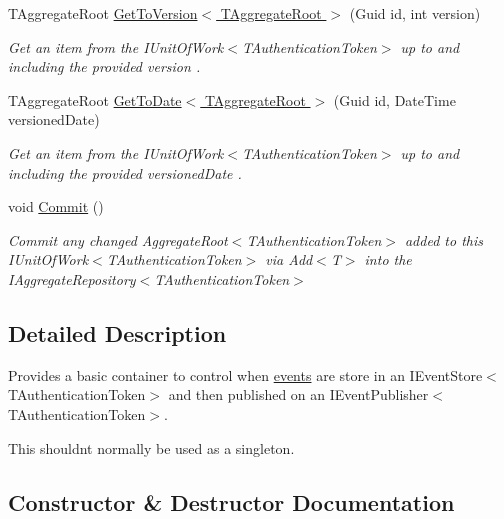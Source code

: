 \begin{DoxyCompactItemize}
T\+Aggregate\+Root \hyperlink{classCqrs_1_1Domain_1_1UnitOfWork_ab5458f49a206e61b94aaaa4b1ac81911_ab5458f49a206e61b94aaaa4b1ac81911}{Get\+To\+Version$<$ T\+Aggregate\+Root $>$} (Guid id, int version)
\begin{DoxyCompactList}\small\item\em Get an item from the I\+Unit\+Of\+Work$<$\+T\+Authentication\+Token$>$ up to and including the provided {\itshape version} . \end{DoxyCompactList}\item 
T\+Aggregate\+Root \hyperlink{classCqrs_1_1Domain_1_1UnitOfWork_aac25e1b9946b0d0337bda627671d0dae_aac25e1b9946b0d0337bda627671d0dae}{Get\+To\+Date$<$ T\+Aggregate\+Root $>$} (Guid id, Date\+Time versioned\+Date)
\begin{DoxyCompactList}\small\item\em Get an item from the I\+Unit\+Of\+Work$<$\+T\+Authentication\+Token$>$ up to and including the provided {\itshape versioned\+Date} . \end{DoxyCompactList}\item 
void \hyperlink{classCqrs_1_1Domain_1_1UnitOfWork_a7401e41dd8ce4457551c252ca6402d31_a7401e41dd8ce4457551c252ca6402d31}{Commit} ()
\begin{DoxyCompactList}\small\item\em Commit any changed Aggregate\+Root$<$\+T\+Authentication\+Token$>$ added to this I\+Unit\+Of\+Work$<$\+T\+Authentication\+Token$>$ via Add$<$\+T$>$ into the I\+Aggregate\+Repository$<$\+T\+Authentication\+Token$>$ \end{DoxyCompactList}\end{DoxyCompactItemize}


\subsection{Detailed Description}
Provides a basic container to control when \hyperlink{}{events} are store in an I\+Event\+Store$<$\+T\+Authentication\+Token$>$ and then published on an I\+Event\+Publisher$<$\+T\+Authentication\+Token$>$. 

This shouldn\textquotesingle{}t normally be used as a singleton. 

\subsection{Constructor \& Destructor Documentation}
\mbox{\label{classCqrs_1_1Domain_1_1UnitOfWork_a9ec92dbd580f3885f7cf5a9ad360e1ac_a9ec92dbd580f3885f7cf5a9ad360e1ac}} 

